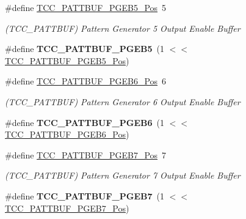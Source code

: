 \begin{DoxyCompactItemize}
\item 
\hypertarget{group___s_a_m_l21___t_c_c_gaaa81e8d2c636c643b0c19d5c0be0a62c}{}\#define \hyperlink{group___s_a_m_l21___t_c_c_gaaa81e8d2c636c643b0c19d5c0be0a62c}{T\+C\+C\+\_\+\+P\+A\+T\+T\+B\+U\+F\+\_\+\+P\+G\+E\+B5\+\_\+\+Pos}~5\label{group___s_a_m_l21___t_c_c_gaaa81e8d2c636c643b0c19d5c0be0a62c}

\begin{DoxyCompactList}\small\item\em (T\+C\+C\+\_\+\+P\+A\+T\+T\+B\+U\+F) Pattern Generator 5 Output Enable Buffer \end{DoxyCompactList}\item 
\hypertarget{group___s_a_m_l21___t_c_c_ga07d59532483af3ab0f1eb061af2cc4bb}{}\#define {\bfseries T\+C\+C\+\_\+\+P\+A\+T\+T\+B\+U\+F\+\_\+\+P\+G\+E\+B5}~(1 $<$$<$ \hyperlink{group___s_a_m_l21___t_c_c_gaaa81e8d2c636c643b0c19d5c0be0a62c}{T\+C\+C\+\_\+\+P\+A\+T\+T\+B\+U\+F\+\_\+\+P\+G\+E\+B5\+\_\+\+Pos})\label{group___s_a_m_l21___t_c_c_ga07d59532483af3ab0f1eb061af2cc4bb}

\item 
\hypertarget{group___s_a_m_l21___t_c_c_ga481999fe331b1010760e5988e1e2349e}{}\#define \hyperlink{group___s_a_m_l21___t_c_c_ga481999fe331b1010760e5988e1e2349e}{T\+C\+C\+\_\+\+P\+A\+T\+T\+B\+U\+F\+\_\+\+P\+G\+E\+B6\+\_\+\+Pos}~6\label{group___s_a_m_l21___t_c_c_ga481999fe331b1010760e5988e1e2349e}

\begin{DoxyCompactList}\small\item\em (T\+C\+C\+\_\+\+P\+A\+T\+T\+B\+U\+F) Pattern Generator 6 Output Enable Buffer \end{DoxyCompactList}\item 
\hypertarget{group___s_a_m_l21___t_c_c_gaa4872d837caa3674e90ab33e19d7b477}{}\#define {\bfseries T\+C\+C\+\_\+\+P\+A\+T\+T\+B\+U\+F\+\_\+\+P\+G\+E\+B6}~(1 $<$$<$ \hyperlink{group___s_a_m_l21___t_c_c_ga481999fe331b1010760e5988e1e2349e}{T\+C\+C\+\_\+\+P\+A\+T\+T\+B\+U\+F\+\_\+\+P\+G\+E\+B6\+\_\+\+Pos})\label{group___s_a_m_l21___t_c_c_gaa4872d837caa3674e90ab33e19d7b477}

\item 
\hypertarget{group___s_a_m_l21___t_c_c_ga297ea2be8dba84ad91b8bd2d56e03ed2}{}\#define \hyperlink{group___s_a_m_l21___t_c_c_ga297ea2be8dba84ad91b8bd2d56e03ed2}{T\+C\+C\+\_\+\+P\+A\+T\+T\+B\+U\+F\+\_\+\+P\+G\+E\+B7\+\_\+\+Pos}~7\label{group___s_a_m_l21___t_c_c_ga297ea2be8dba84ad91b8bd2d56e03ed2}

\begin{DoxyCompactList}\small\item\em (T\+C\+C\+\_\+\+P\+A\+T\+T\+B\+U\+F) Pattern Generator 7 Output Enable Buffer \end{DoxyCompactList}\item 
\hypertarget{group___s_a_m_l21___t_c_c_gacac4e771b0bc71d0c7686860701b1d98}{}\#define {\bfseries T\+C\+C\+\_\+\+P\+A\+T\+T\+B\+U\+F\+\_\+\+P\+G\+E\+B7}~(1 $<$$<$ \hyperlink{group___s_a_m_l21___t_c_c_ga297ea2be8dba84ad91b8bd2d56e03ed2}{T\+C\+C\+\_\+\+P\+A\+T\+T\+B\+U\+F\+\_\+\+P\+G\+E\+B7\+\_\+\+Pos})\label{group___s_a_m_l21___t_c_c_gacac4e771b0bc71d0c7686860701b1d98}


\end{DoxyCompactItemize}
